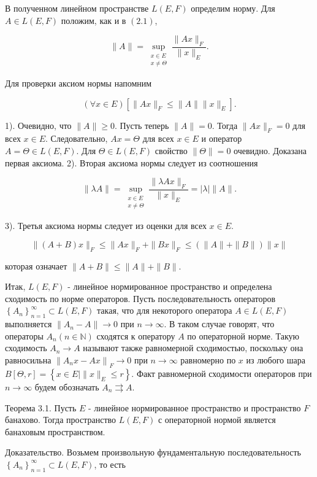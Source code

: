 В полученном линейном пространстве $L(E, F)$ определим норму. Для $A \in L(E, F)$ положим, как и в $(2.1)$,

$$
	\|A\|=\sup _{\substack{x \in E \\ x \neq \Theta}} \frac{\|A x\|_{F}}{\|x\|_{E}} .
$$

Для проверки аксиом нормы напомним

$$
	(\forall x \in E)\left[\|A x\|_{F} \leq\|A\|\|x\|_{E}\right] .
$$

1). Очевидно, что $\|A\| \geq 0$. Пусть теперь $\|A\|=0$. Тогда $\|A x\|_{F}=0$ для всех $x \in E$. Следовательно, $A x=\Theta$ для всех $x \in E$ и оператор $A=\Theta \in L(E, F)$. Для $\Theta \in L(E, F)$ свойство $\|\Theta\|=0$ очевидно. Доказана первая аксиома. 2). Вторая аксиома нормы следует из соотношения

$$
	\|\lambda A\|=\sup _{\substack{x \in E \\ x \neq \Theta}} \frac{\|\lambda A x\|_{F}}{\|x\|_{E}}=|\lambda|\|A\| .
$$

3). Третья аксиома нормы следует из оценки для всех $x \in E$.

$$
	\|(A+B) x\|_{F} \leq\|A x\|_{F}+\|B x\|_{F} \leq(\|A\|+\|B\|)\|x\|
$$

которая означает $\|A+B\| \leq\|A\|+\|B\|$.

Итак, $L(E, F)$ - линейное нормированное пространство и определена сходимость по норме операторов. Пусть последовательность операторов $\left\{A_{n}\right\}_{n=1}^{\infty} \subset L(E, F)$ такая, что для некоторого оператора $A \in L(E, F)$ выполняется $\left\|A_{n}-A\right\| \rightarrow 0$ при $n \rightarrow \infty$. В таком случае говорят, что операторы $A_{n}(n \in \mathbb{N})$ сходятся к оператору $A$ по операторной норме. Такую сходимость $A_{n} \rightarrow A$ называют также равномерной сходимостью, поскольку она равносильна $\left\|A_{n} x-A x\right\|_{F} \rightarrow 0$ при $n \rightarrow \infty$ равномерно по $x$ из любого шара $B[\Theta, r]=\left\{x \in E \mid\|x\|_{E} \leq r\right\}$. Факт равномерной сходимости операторов при $n \rightarrow \infty$ будем обозначать $A_{n} \rightrightarrows A$.

Теорема 3.1. Пусть $E$ - линейное нормированное пространство и пространство $F$ банахово. Тогда пространство $L(E, F)$ с операторной нормой является банаховым пространством.

Доказательство. Возьмем произвольную фундаментальную последовательность $\left\{A_{n}\right\}_{n=1}^{\infty} \subset L(E, F)$, то есть

